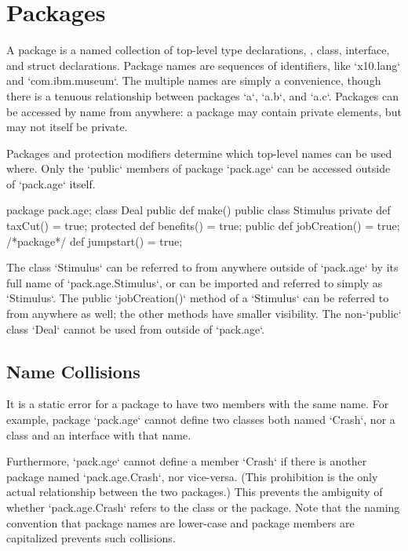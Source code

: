 \section{Packages}

A package is a named collection of top-level type declarations, \viz, class,
interface, and struct declarations. Package names are sequences of
identifiers, like \xcd`x10.lang` and \xcd`com.ibm.museum`. The multiple names
are simply a convenience, though there is a tenuous relationship between
packages \xcd`a`, \xcd`a.b`, and \xcd`a.c`.   Packages can be accessed by
name from anywhere: a package may contain private elements, but may not itself
be private. 

Packages and protection modifiers determine which top-level names can be used
where. Only the \xcd`public` members of package \xcd`pack.age` can be accessed
outside of \xcd`pack.age` itself.  
% 
\begin{xten}
package pack.age;
class Deal {
  public def make() {}
}
public class Stimulus {
  private def taxCut() = true;
  protected def benefits() = true;
  public def jobCreation() = true;
  /*package*/ def jumpstart() = true;
}
\end{xten}
%

The class \xcd`Stimulus` can be referred to from anywhere outside of
\xcd`pack.age` by its full name of \xcd`pack.age.Stimulus`, or can be imported
and referred to simply as \xcd`Stimulus`.  The public \xcd`jobCreation()`
method of a \xcd`Stimulus` can be referred to from anywhere as well; the other
methods have smaller visibility.  The non-\xcd`public` class \xcd`Deal` cannot
be used from outside of \xcd`pack.age`.  



\subsection{Name Collisions}

It is a static error for a package to have two members with the same name. For
example, package \xcd`pack.age` cannot define two classes both named
\xcd`Crash`, nor a class and an interface with that name.

Furthermore, \xcd`pack.age` cannot define a member \xcd`Crash` if there is
another package named \xcd`pack.age.Crash`, nor vice-versa. (This prohibition
is the only actual relationship between the two packages.)  This prevents the
ambiguity of whether \xcd`pack.age.Crash` refers to the class or the package.  
Note that the naming convention that package names are lower-case and package
members are capitalized prevents such collisions.


